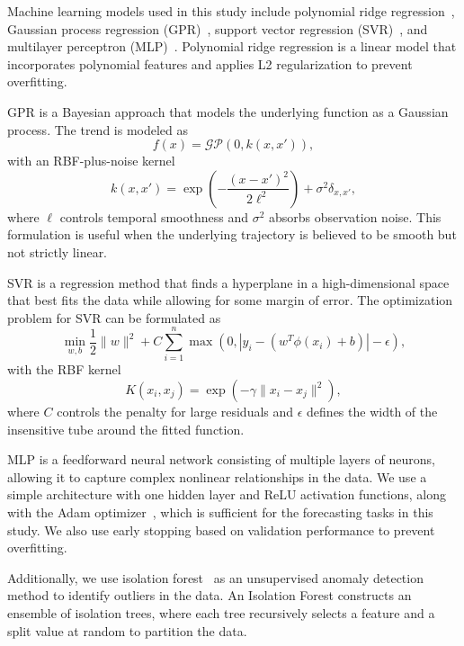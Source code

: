 Machine learning models used in this study include polynomial ridge regression~\cite{hoerl1970ridge}, Gaussian process regression (GPR)~\cite{seeger2004gaussian}, support vector regression (SVR)~\cite{smola2004tutorial}, and multilayer perceptron (MLP)~\cite{goodfellow2016deep}. Polynomial ridge regression is a linear model that incorporates polynomial features and applies L2 regularization to prevent overfitting.

GPR is a Bayesian approach that models the underlying function as a Gaussian process. The trend is modeled as
\begin{equation}
	f(x) = \mathcal{GP}(0, k(x, x')),
\end{equation}
with an RBF-plus-noise kernel
\begin{equation}
	k(x, x') = \exp \left( -\frac{(x - x')^2}{2 \ell^2} \right) + \sigma^2 \delta_{x, x'},
\end{equation}
where $\ell$ controls temporal smoothness and $\sigma^2$ absorbs observation noise. This formulation is useful when the underlying trajectory is believed to be smooth but not strictly linear.

SVR is a regression method that finds a hyperplane in a high-dimensional space that best fits the data while allowing for some margin of error. The optimization problem for SVR can be formulated as
\begin{equation}
	\min_{w, b} \frac{1}{2} \| w \|^2 + C \sum_{i=1}^n \max(0, |y_i - (w^T \phi(x_i) + b)| - \epsilon),
\end{equation}
with the RBF kernel
\begin{equation}
	K(x_i, x_j) = \exp \left( -\gamma \| x_i - x_j \|^2 \right),
\end{equation}
where \(C\) controls the penalty for large residuals and \(\epsilon\) defines the width of the insensitive tube around the fitted function.

MLP is a feedforward neural network consisting of multiple layers of neurons, allowing it to capture complex nonlinear relationships in the data. We use a simple architecture with one hidden layer and ReLU activation functions, along with the Adam optimizer~\cite{kingma2014adam}, which is sufficient for the forecasting tasks in this study. We also use early stopping based on validation performance to prevent overfitting.

Additionally, we use isolation forest~\cite{tony2008isolation} as an unsupervised anomaly detection method to identify outliers in the data. An Isolation Forest constructs an ensemble of isolation trees, where each tree recursively selects a feature and a split value at random to partition the data.
